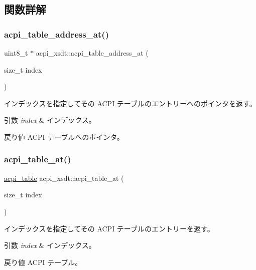 \subsection{関数詳解}
\hypertarget{classacpi__xsdt_a07d908cc4f42f15d3e4529b844763abc}{}\label{classacpi__xsdt_a07d908cc4f42f15d3e4529b844763abc} 
\subsubsection{\texorpdfstring{acpi\+\_\+table\+\_\+address\+\_\+at()}{acpi\_table\_address\_at()}}
{\footnotesize\ttfamily uint8\+\_\+t $\ast$ acpi\+\_\+xsdt\+::acpi\+\_\+table\+\_\+address\+\_\+at (\begin{DoxyParamCaption}\item[{size\+\_\+t}]{index }\end{DoxyParamCaption})}

インデックスを指定してその A\+C\+PI テーブルのエントリーへのポインタを返す。 
\begin{DoxyParams}{引数}
{\em index} & インデックス。 \\
\hline
\end{DoxyParams}
\begin{DoxyReturn}{戻り値}
A\+C\+PI テーブルへのポインタ。 
\end{DoxyReturn}
\hypertarget{classacpi__xsdt_a4d2326989b3fda0dbb32e480d2b92c97}{}\label{classacpi__xsdt_a4d2326989b3fda0dbb32e480d2b92c97} 
\subsubsection{\texorpdfstring{acpi\+\_\+table\+\_\+at()}{acpi\_table\_at()}}
{\footnotesize\ttfamily \hyperlink{acpi_8h_a64dfa94462992cc30eb68821513817ff}{acpi\+\_\+table} acpi\+\_\+xsdt\+::acpi\+\_\+table\+\_\+at (\begin{DoxyParamCaption}\item[{size\+\_\+t}]{index }\end{DoxyParamCaption})}

インデックスを指定してその A\+C\+PI テーブルのエントリーを返す。 
\begin{DoxyParams}{引数}
{\em index} & インデックス。 \\
\hline
\end{DoxyParams}
\begin{DoxyReturn}{戻り値}
A\+C\+PI テーブル。 
\end{DoxyReturn}
\hypertarget{classacpi__xsdt_a783b4ff904191b61a9a3aa363d5056ef}{}\label{classacpi__xsdt_a783b4ff904191b61a9a3aa363d5056ef} 
